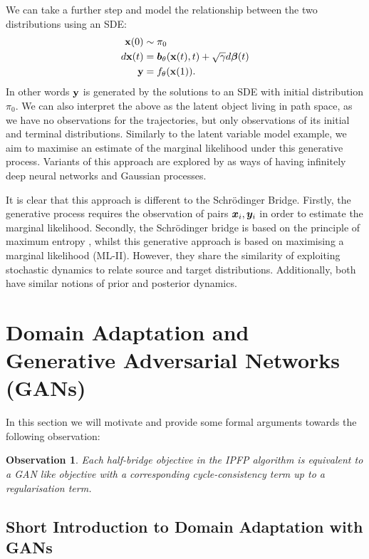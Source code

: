 \documentclass[a4paper,12pt,twoside,openright]{report}
\newtheorem{observation}{Observation}
\theoremstyle{definition}
\begin{document}
We can take a further step and model the relationship between the two distributions using an SDE:
\begin{align*}
    {\mathbf{x}}(0) &\sim \pi_0 \\
    d{\mathbf{x}}(t) &= {\bm{b}}_{\theta}({\mathbf{x}}(t), t) + \sqrt{\gamma} d{\bm{\beta}}(t) \\
    {\mathbf{y}} &= f_{\theta}({\mathbf{x}}(1)).
\end{align*}
In other words ${\mathbf{y}}$ is generated by the solutions to an SDE with initial distribution $\pi_0$. We can also interpret the above as the latent object living in path space, as we have no observations for the trajectories, but only observations of its initial and terminal distributions. Similarly to the latent variable model example, we aim to maximise an estimate of the marginal likelihood under this generative process. Variants of this approach are explored by \citep{lahdesmakideep, tzen2019neural} as ways of having infinitely deep neural networks and Gaussian processes.

It is clear that this approach is different to the Schrödinger Bridge. Firstly, the generative process requires the observation of pairs ${\bm{x}}_i, {\bm{y}}_i$ in order to estimate the marginal likelihood. Secondly, the Schrödinger bridge is based on the principle of maximum entropy \citep{jaynes1957information}, whilst this generative approach is based on maximising a marginal likelihood (ML-II). However, they share the similarity of exploiting stochastic dynamics to relate source and target distributions. Additionally, both have similar notions of prior and posterior dynamics.

\section{Domain Adaptation and Generative Adversarial Networks (GANs)}

In this section we will motivate and provide some formal arguments towards the following observation:
\begin{observation}
Each half-bridge objective in the IPFP algorithm is equivalent to a GAN like objective with a corresponding cycle-consistency term up to a  regularisation term.
\end{observation}

\subsection{Short Introduction to Domain Adaptation with GANs}
\end{document}
